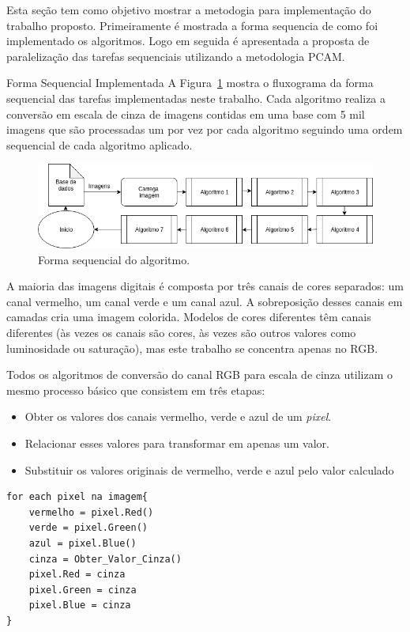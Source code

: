 Esta seção tem como objetivo mostrar a metodogia para implementação do trabalho
proposto. Primeiramente é mostrada a forma sequencia de como foi implementado os
algoritmos. Logo em seguida é apresentada a proposta de paralelização das tarefas
sequenciais utilizando a metodologia PCAM.

\begin{subsection}{Forma Sequencial Implementada}
A Figura~\ref{fig:gray} mostra o fluxograma da forma sequencial das tarefas
implementadas neste trabalho. Cada algoritmo realiza a conversão em escala de
cinza de imagens contidas em uma base com 5 mil imagens que são processadas um
por vez por cada algoritmo seguindo uma ordem sequencial de cada algoritmo
aplicado.  

\begin{figure}[!h]
	\centering
	\includegraphics[width=0.95\linewidth]{figs/Sequential.png}
	\caption{Forma sequencial do algoritmo.}
	\label{fig:gray}
\end{figure}



A maioria das imagens digitais é composta por três canais de cores separados: um
canal vermelho, um canal verde e um canal azul. A sobreposição desses canais em
camadas cria uma imagem colorida. Modelos de cores diferentes têm canais
diferentes (às vezes os canais são cores, às vezes são outros valores como
luminosidade ou saturação), mas este trabalho se concentra apenas no RGB.

Todos os algoritmos de conversão do canal RGB para escala de cinza utilizam 
o mesmo processo básico que consistem em três etapas:

\begin{itemize}
\item Obter os valores dos canais vermelho, verde e azul de um \textit{pixel}.
\item Relacionar esses valores para transformar em apenas um valor.
\item Substituir os valores originais de vermelho, verde e azul pelo valor calculado
\end{itemize}


\begin{lstlisting}
for each pixel na imagem{
    vermelho = pixel.Red()
    verde = pixel.Green()
    azul = pixel.Blue()
    cinza = Obter_Valor_Cinza()
    pixel.Red = cinza
    pixel.Green = cinza
    pixel.Blue = cinza
}
\end{lstlisting}



\end{subsection}
